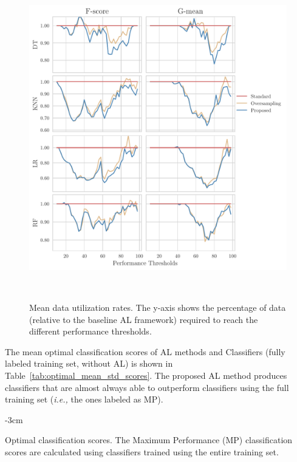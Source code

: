 \documentclass[preprint, 12pt]{elsarticle}
\begin{document}
\begin{figure}
	\centering
	\includegraphics[width=1\linewidth]{../analysis/data_utilization_rate}
    \caption{%
        Mean data utilization rates. The y-axis shows the percentage of data
        (relative to the baseline AL framework) required to reach the
        different performance thresholds.
    }~\label{fig:dur}
\end{figure}

The mean optimal classification scores of AL methods and Classifiers (fully
labeled training set, without AL) is shown in
Table~\ref{tab:optimal_mean_std_scores}. The proposed AL method produces
classifiers that are almost always able to outperform classifiers using the
full training set (\textit{i.e.,} the ones labeled as MP).

\begin{table}
    \centering
    \addtolength{\leftskip} {-3cm}
    \addtolength{\rightskip}{-3cm}
    \caption{\label{tab:optimal_mean_std_scores}
        Optimal classification scores. The Maximum Performance (MP)
        classification scores are calculated using classifiers trained using
        the entire training set.
    }
\end{table}
\end{document}
